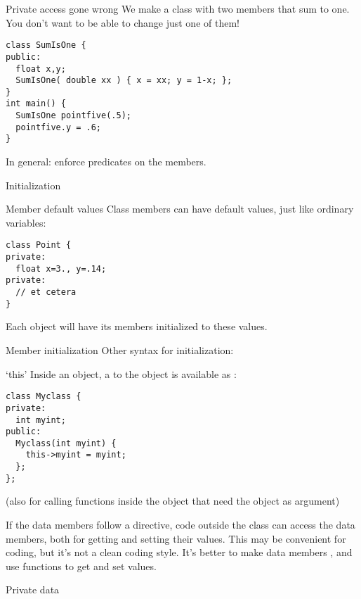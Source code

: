 \begin{block}{Private access gone wrong}
  \label{sl:privatenogood}
  We make a class with two members that sum to one.\\
  You don't want to be able to change just one of them!
\begin{verbatim}
class SumIsOne {
public: 
  float x,y;
  SumIsOne( double xx ) { x = xx; y = 1-x; };
}
int main() {
  SumIsOne pointfive(.5);
  pointfive.y = .6;
}
\end{verbatim}
In general: enforce predicates on the members.
\end{block}

 {Initialization}

\begin{block}{Member default values}
  \label{sl:class-defval}
  Class members can have default values, just like ordinary variables:
\begin{verbatim}
class Point {
private:
  float x=3., y=.14;
private:
  // et cetera
}
\end{verbatim}
  Each object will have its members initialized to these values.
\end{block}

\begin{block}{Member initialization}
  \label{sl:class-init}
  Other syntax for initialization:
\end{block}

\begin{block}{`this'}
  \label{sl:class-this}
  Inside an object, a  to the object is available
  as :
\begin{verbatim}
class Myclass {
private:
  int myint;
public:
  Myclass(int myint) {
    this->myint = myint;
  };
};
\end{verbatim}
(also for calling functions inside the object that need the object as argument)
\end{block}

If the data members follow a  directive, code
outside the class can access the data members, both for getting and
setting their values. This may be convenient for coding, but it's not
a clean coding style. It's better to make data members
, and use  functions to get
and set values.

\begin{block}{Private data}
  \label{sl:class-private}
\end{block}

